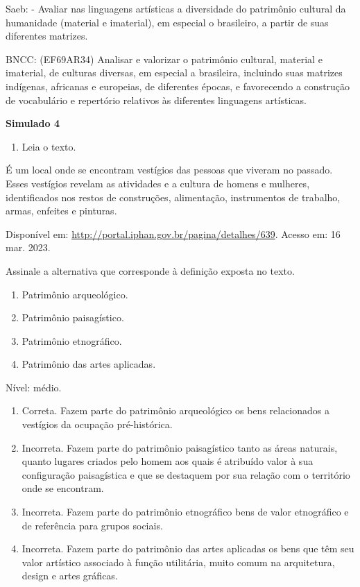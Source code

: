 \begin{escolha}
{{{{{{{{Saeb: - Avaliar nas linguagens artísticas a diversidade do patrimônio
cultural da humanidade (material e imaterial), em especial o brasileiro,
a partir de suas diferentes matrizes.

BNCC: (EF69AR34) Analisar e valorizar o patrimônio cultural, material e
imaterial, de culturas diversas, em especial a brasileira, incluindo
suas matrizes indígenas, africanas e europeias, de diferentes épocas, e
favorecendo a construção de vocabulário e repertório relativos às
diferentes linguagens artísticas.

\textbf{Simulado 4}

\begin{enumerate}
\def\labelenumi{\arabic{enumi}.}
\item
  Leia o texto.
\end{enumerate}

É um local onde se encontram vestígios das pessoas que viveram no
passado. Esses vestígios revelam as atividades e a cultura de homens e
mulheres, identificados nos restos de construções, alimentação,
instrumentos de trabalho, armas, enfeites e pinturas.~

Disponível em: \url{http://portal.iphan.gov.br/pagina/detalhes/639}.
Acesso em: 16 mar. 2023.

Assinale a alternativa que corresponde à definição exposta no texto.

\begin{enumerate}
\def\labelenumi{\alph{enumi}.}
\item
  Patrimônio arqueológico.
\item
  Patrimônio paisagístico.
\item
  Patrimônio etnográfico.
\item
  Patrimônio das artes aplicadas.
\end{enumerate}

Nível: médio.

\begin{enumerate}
\def\labelenumi{\alph{enumi}.}
\item
  Correta. Fazem parte do patrimônio arqueológico os bens relacionados a
  vestígios da ocupação pré-histórica.
\item
  Incorreta. Fazem parte do patrimônio paisagístico tanto as áreas
  naturais, quanto lugares criados pelo homem aos quais é atribuído
  valor à sua configuração paisagística e que se destaquem por sua
  relação com o território onde se encontram.
\item
  Incorreta. Fazem parte do patrimônio etnográfico bens de valor
  etnográfico e de referência para grupos sociais.
\item
  Incorreta. Fazem parte do patrimônio das artes aplicadas os bens que
  têm seu valor artístico associado à função utilitária, muito comum na
  arquitetura, design e artes gráficas.
\end{enumerate}

}}}}}}}}
\end{escolha}
